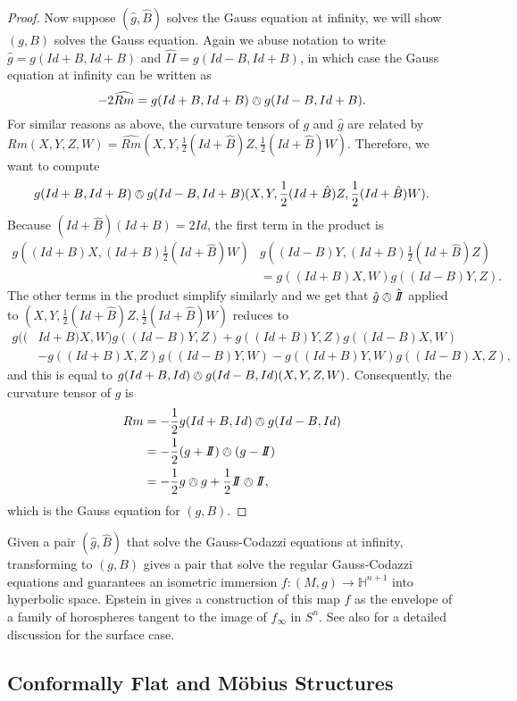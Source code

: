 \documentclass{amsart}
\newcommand{\two}{I\!\!I}
\numberwithin{equation}{section}
\renewcommand{\H}{\mathbb{H}}
\begin{document}
\begin{proof}
Now suppose $(\hat{g},\hat{B})$ solves the Gauss equation at infinity, we will show $(g,B)$ solves the Gauss equation.
Again we abuse notation to write $\hat{g} = g(Id + B, Id + B)$ and $\hat{\two} = g(Id - B, Id + B)$, in which case the Gauss equation at infinity can be written as
\[
-2\widehat{Rm} = g(Id+B,Id+B)\owedge g(Id-B,Id+B).
\]
For similar reasons as above, the curvature tensors of $g$ and $\hat{g}$ are related by $Rm(X,Y,Z,W) = \widehat{Rm}(X,Y,\frac{1}{2}(Id+\hat{B})Z,\frac{1}{2}(Id+\hat{B})W)$.
Therefore, we want to compute
\[
g(Id+B,Id+B)\owedge g(Id-B,Id+B)(X,Y,\frac{1}{2}(Id+\hat{B})Z,\frac{1}{2}(Id+\hat{B})W).
\]
Because $(Id+\hat{B})(Id+B) = 2Id$, the first term in the product is 
\begin{align*}
g((Id+B)X,(Id + B)\frac{1}{2}(Id+\hat{B})W)&g((Id-B)Y,(Id+B)\frac{1}{2}(Id+\hat{B})Z) \\
&= g((Id+B)X,W)g((Id-B)Y,Z).
\end{align*}
The other terms in the product simplify similarly and we get that $\hat{g}\owedge\hat{\two}$ applied to $(X,Y,\frac{1}{2}(Id+\hat{B})Z,\frac{1}{2}(Id+\hat{B})W)$ reduces to 
\begin{align*}
g((&Id+B)X,W)g((Id-B)Y,Z) + g((Id+B)Y,Z)g((Id-B)X,W) \\
&-g((Id+B)X,Z)g((Id-B)Y,W) - g((Id+B)Y,W)g((Id-B)X,Z),
\end{align*}
and this is equal to $g(Id+B,Id)\owedge g(Id-B,Id)(X,Y,Z,W)$.
Consequently, the curvature tensor of $g$ is
\begin{align*}
Rm &= -\frac{1}{2}g(Id+B,Id)\owedge g(Id-B,Id) \\
&= -\frac{1}{2}(g+\two)\owedge(g-\two) \\
&= -\frac{1}{2}g \owedge g + \frac{1}{2}\two \owedge \two,
\end{align*}
which is the Gauss equation for $(g,B)$.

\end{proof}

Given a pair $(\hat{g},\hat{B})$ that solve the Gauss-Codazzi equations at infinity, transforming to $(g,B)$ gives a pair that solve the regular Gauss-Codazzi equations and guarantees an isometric immersion $f: (M,g) \to \H^{n+1}$ into hyperbolic space. 
Epstein in \cite{Epstein1984} gives a construction of this map $f$ as the envelope of a family of horospheres tangent to the image of $f_\infty$ in $S^n$.
See also \cite{Anderson1998} for a detailed discussion for the surface case.

\subsection{Conformally Flat and M\"obius Structures}
\end{document}
